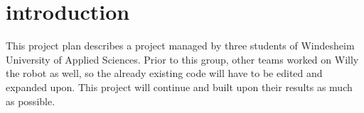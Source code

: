 \section{introduction}
This project plan describes a project managed by three students of Windesheim University of Applied Sciences. 
Prior to this group, other teams worked on Willy the robot as well, so the already existing code will have to be edited and expanded upon. 
This project will continue and built upon their results as much as possible. 

\newpage

